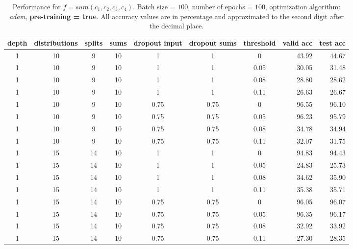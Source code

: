 \begin{table}[H]
  \centering
  \caption{Performance for $\mathit{f} = sum(\mathit{c}_1,\mathit{c}_2,\mathit{c}_3,\mathit{c}_4)$. Batch size = $100$, number of epochs = $100$, optimization algorithm: \textit{adam}, \textbf{pre-training = true}. All accuracy values are in percentage and approximated to the second digit after the decimal place.}
  \label{tab:results-quadruples-clyes}
  \scriptsize
  \begin{tabular}{cccccccrr}
    \toprule
    depth		& distributions 	& splits 		& sums 				& dropout input 		& dropout sums 			& threshold				& valid acc 			& test acc\\
    \midrule
	1 			& 10     			& 9 			& 10     			& 1 					& 1 					& 0 					& 43.92   				& 44.67\\
	1 			& 10     			& 9 			& 10     			& 1 					& 1 					& 0.05    				& 30.05    				& 31.48\\
	1 			& 10     			& 9 			& 10     			& 1 					& 1 					& 0.08    				& 28.80    				& 28.62\\
	1 			& 10     			& 9 			& 10     			& 1 					& 1 					& 0.11    				& 26.63    				& 26.67\\
	1 			& 10     			& 9 			& 10     			& 0.75    				& 0.75    				& 0 					& 96.55    				& 96.10\\
	1 			& 10     			& 9 			& 10     			& 0.75    				& 0.75    				& 0.05    				& 96.23    				& 95.79\\
	1 			& 10     			& 9 			& 10     			& 0.75    				& 0.75    				& 0.08    				& 34.78    				& 34.94\\
	1 			& 10     			& 9 			& 10     			& 0.75    				& 0.75    				& 0.11   				& 32.07    				& 31.75\\
	
	1 			& 15     			& 14     		& 10     			& 1 					& 1 					& 0 					& 94.83    				& 94.43\\
	1 			& 15     			& 14     		& 10     			& 1 					& 1 					& 0.05   				& 24.83    				& 25.73\\
	1 			& 15     			& 14     		& 10     			& 1 					& 1 					& 0.08    				& 34.62    				& 35.90\\
	1 			& 15     			& 14     		& 10     			& 1 					& 1 					& 0.11    				& 35.38    				& 35.71\\
	1 			& 15     			& 14     		& 10     			& 0.75    				& 0.75    				& 0 					& 96.05    				& 96.07\\	
	1 			& 15     			& 14     		& 10     			& 0.75    				& 0.75    				& 0.05    				& 96.35    				& 96.17\\
	1 			& 15     			& 14     		& 10     			& 0.75    				& 0.75    				& 0.08    				& 32.92    				& 33.92\\
	1 			& 15     			& 14     		& 10     			& 0.75    				& 0.75    				& 0.11   				& 27.30    				& 28.35\\


\end{tabular}
\end{table}
